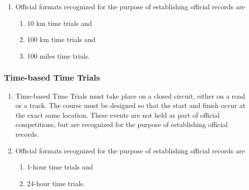 \begin{enumerate}[leftmargin=1.5em,labelsep=*]
\begin{enumerate}[label*=\arabic*,leftmargin=1.5em,labelsep=*]
\begin{enumerate}[label*=.\arabic*,leftmargin=2.25em,labelsep=*]
\begin{enumerate}[label=\roman*,leftmargin=2.25em,labelsep=*]
				\end{enumerate}
			\end{enumerate}
			\item For time trials held outside of official competitions, such as those organized for the purpose of record attempts, 
            it is recommended to use a closed course on a road or track.
			The course must be measured and verified in accordance with the WR guidelines.
		\end{enumerate}
		\item Official formats recognized for the purpose of establishing official records are
		\begin{enumerate}[label=\roman*,leftmargin=2.25em,labelsep=*]
			\item 10 km time trials and
			\item 100 km time trials and
			\item 100 miles time trials.
		\end{enumerate}
	\end{enumerate}

\subsubsection{Time-based Time Trials}
	\begin{enumerate}[leftmargin=1.5em,labelsep=*]
		\item Time-based Time Trials must take place on a closed circuit, either on a road or a track.
		The course must be designed so that the start and finish occur at the exact same location.
		These events are not held as part of official competitions, but are recognized for the purpose of establishing official records.
		\item Official formats recognized for the purpose of establishing official records are
		\begin{enumerate}[label=\roman*,leftmargin=2.25em,labelsep=*]
			\item 1-hour time trials and
			\item 24-hour time trials.
		\end{enumerate}
	\end{enumerate}

